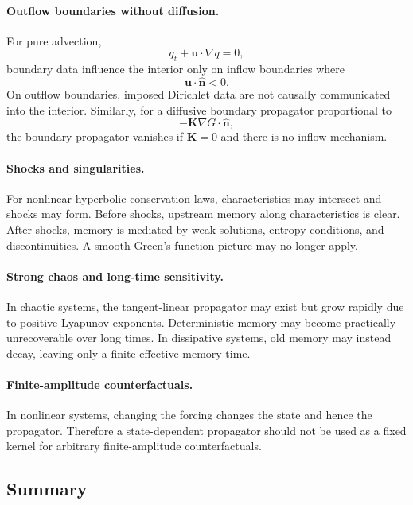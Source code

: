 \documentclass[10pt]{amsart}
\begin{document}
\paragraph{Outflow boundaries without diffusion.}
For pure advection,
\begin{equation}
q_t+\mathbf u\cdot\nabla q=0,
\end{equation}
boundary data influence the interior only on inflow boundaries where
\begin{equation}
\mathbf u\cdot\hat{\mathbf n}<0.
\end{equation}
On outflow boundaries, imposed Dirichlet data are not causally communicated into the interior. Similarly, for a diffusive boundary propagator proportional to
\begin{equation}
-\mathbf K\nabla G\cdot\hat{\mathbf n},
\end{equation}
the boundary propagator vanishes if \(\mathbf K=0\) and there is no inflow mechanism.

\paragraph{Shocks and singularities.}
For nonlinear hyperbolic conservation laws, characteristics may intersect and shocks may form. Before shocks, upstream memory along characteristics is clear. After shocks, memory is mediated by weak solutions, entropy conditions, and discontinuities. A smooth Green's-function picture may no longer apply.

\paragraph{Strong chaos and long-time sensitivity.}
In chaotic systems, the tangent-linear propagator may exist but grow rapidly due to positive Lyapunov exponents. Deterministic memory may become practically unrecoverable over long times. In dissipative systems, old memory may instead decay, leaving only a finite effective memory time.

\paragraph{Finite-amplitude counterfactuals.}
In nonlinear systems, changing the forcing changes the state and hence the propagator. Therefore a state-dependent propagator should not be used as a fixed kernel for arbitrary finite-amplitude counterfactuals.

\subsection{Summary}
\end{document}
